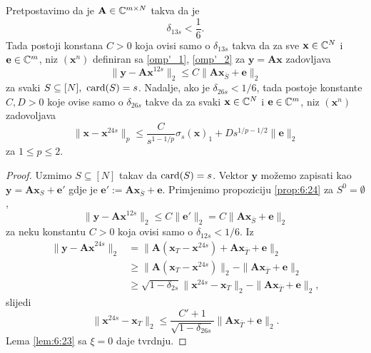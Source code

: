 \documentclass[a4paper,twoside,12pt]{memoir} %
\newcommand{\vect}[1]{\mathbf{#1}}
\renewcommand{\vec}{\vect}
\newcommand{\card}{\text{\normalfont{card}}}
\newcommand{\norm}[1]{\|{#1}\|}
\begin{document}
\begin{thm}
    Pretpostavimo da je $\vec A \in \C^{m \times N}$ takva da je 
    \begin{equation*}
        \delta_{13s} < \frac{1}{6}. 
    \end{equation*}
    Tada postoji konstana $C>0$ koja ovisi samo o $\delta_{13s}$ takva da za sve $\vec x \in \C^N$ i $\vec e \in \C^m$, niz $(\vec x^n)$ definiran sa \eqref{omp'_1}, \eqref{omp'_2} za $\vec y = \vec{Ax}$ zadovljava
    \begin{equation*}
        \norm{\vec y - \vec{Ax}^{12s}}_2 \leq C \norm{\vec{Ax}_{\bar S} + \vec e}_2
    \end{equation*}
    za svaki $S \subseteq [N],\ \card(S) = s$. Nadalje, ako je $\delta_{26s} < 1/6$, tada postoje konstante $C,D>0$ koje ovise samo o $\delta_{26s}$ takve da za svaki $\vec x \in \C^N$ i $\vec e \in \C^m$, niz $(\vec x^n)$ zadovoljava
    \begin{equation*}
        \norm{\vec x - \vec x^{24s}}_p \leq \frac{C}{s^{1-1/p}} \sigma_s(\vec x)_1 + Ds^{1/p - 1/2} \norm{\vec e}_2  
    \end{equation*}
    za $1 \leq p \leq 2$.
\end{thm}
\begin{proof}
    Uzmimo $S \subseteq [N]$ takav da $\card(S)=s$. Vektor $\vec y$ mo\v{z}emo zapisati kao $\vec y = \vec{Ax}_S + \vec e'$ gdje je $\vec e' := \vec{Ax}_{\bar S} + \vec e$. Primjenimo propoziciju \ref{prop:6:24} za $S^0 = \emptyset$, 
    \begin{equation*}
        \norm{\vec y- \vec{Ax}^{12s}}_2 \leq C \norm{\vec e'}_2 = C \norm{\vec{Ax}_{\bar S} + \vec e}_2 
    \end{equation*}
    za neku konstantu $C>0$ koja ovisi samo o $\delta_{12s} < 1/6$. Iz 
    \begin{align*}
        \norm{\vec y - \vec{Ax}^{24s}}_2 & = \norm{\vec A(\vec x_T - \vec x^{24s}) + \vec{Ax}_{\bar T} + \vec e}_2\\[0.5em]
        & \geq \norm{\vec A(\vec x_T - \vec{x}^{24s})}_2 - \norm{\vec{Ax}_{\bar T} + \vec e}_2\\
        & \geq \sqrt{1 - \delta_{2s}} \norm{\vec x^{24s} - \vec x_T}_2 - \norm{\vec{Ax}_{\bar T} + \vec e}_2,
    \end{align*}
    slijedi
    \begin{equation*}
        \norm{\vec x^{24s} - \vec x_T}_2 \leq \frac{C'+1}{\sqrt{1 - \delta_{26s}}} \norm{\vec{Ax}_{\bar T} + \vec e}_2. 
    \end{equation*}
    Lema \ref{lem:6:23} sa $\xi = 0$ daje tvrdnju.
\end{proof}
\end{document}
